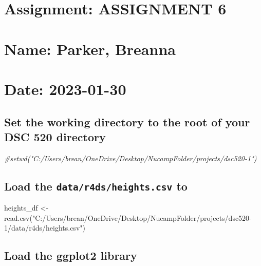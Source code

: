 \documentclass[
]{article}
\author{}
\date{\vspace{-2.5em}}
\newenvironment{Shaded}{\begin{snugshade}}{\end{snugshade}}
\newcommand{\CommentTok}[1]{\textcolor[rgb]{0.56,0.35,0.01}{\textit{#1}}}
\newcommand{\FunctionTok}[1]{\textcolor[rgb]{0.00,0.00,0.00}{#1}}
\newcommand{\NormalTok}[1]{#1}
\newcommand{\OtherTok}[1]{\textcolor[rgb]{0.56,0.35,0.01}{#1}}
\newcommand{\StringTok}[1]{\textcolor[rgb]{0.31,0.60,0.02}{#1}}
\begin{document}
\hypertarget{assignment-assignment-6}{%
\section{Assignment: ASSIGNMENT 6}\label{assignment-assignment-6}}

\hypertarget{name-parker-breanna}{%
\section{Name: Parker, Breanna}\label{name-parker-breanna}}

\hypertarget{date-2023-01-30}{%
\section{Date: 2023-01-30}\label{date-2023-01-30}}

\hypertarget{set-the-working-directory-to-the-root-of-your-dsc-520-directory}{%
\subsection{Set the working directory to the root of your DSC 520
directory}\label{set-the-working-directory-to-the-root-of-your-dsc-520-directory}}

\begin{Shaded}
\begin{Highlighting}[]
\CommentTok{\#setwd("C:/Users/brean/OneDrive/Desktop/NucampFolder/projects/dsc520{-}1")}
\end{Highlighting}
\end{Shaded}

\hypertarget{load-the-datar4dsheights.csv-to}{%
\subsection{\texorpdfstring{Load the \texttt{data/r4ds/heights.csv}
to}{Load the data/r4ds/heights.csv to}}\label{load-the-datar4dsheights.csv-to}}

\begin{Shaded}
\begin{Highlighting}[]
\NormalTok{heights\_df }\OtherTok{\textless{}{-}} \FunctionTok{read.csv}\NormalTok{(}\StringTok{"C:/Users/brean/OneDrive/Desktop/NucampFolder/projects/dsc520{-}1/data/r4ds/heights.csv"}\NormalTok{)}
\end{Highlighting}
\end{Shaded}

\hypertarget{load-the-ggplot2-library}{%
\subsection{Load the ggplot2 library}\label{load-the-ggplot2-library}}
\end{document}
